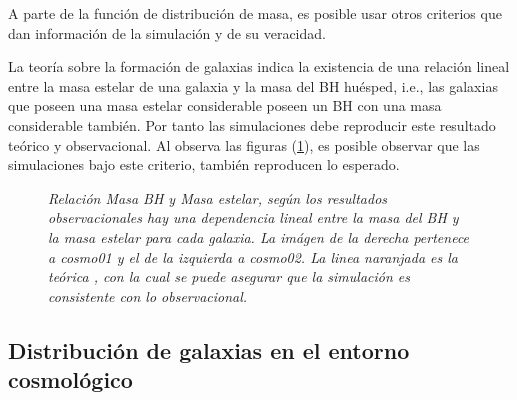 A parte de la función de distribución de masa, es posible usar otros criterios que dan información de la simulación y de su veracidad. 

La teoría sobre la formación de galaxias indica la existencia de una relación lineal entre la masa estelar de una galaxia y la masa del BH huésped, i.e., las galaxias que poseen una masa estelar considerable poseen un BH con una masa considerable también. Por tanto las simulaciones debe reproducir este resultado teórico y observacional. Al observa las figuras (\ref{fig: Mass_bhVsMass_stelar}), es posible observar que las simulaciones bajo este criterio, también reproducen lo esperado. 
%
 \begin{figure}
 \centering
 \caption{\emph{Relación Masa BH y Masa estelar, según los resultados observacionales hay una dependencia lineal entre la masa del BH y la masa estelar para cada galaxia. La imágen de la derecha pertenece a {\it{cosmo01}} y el de la izquierda a {\it{cosmo02}}. La linea naranjada es la teórica \cite{McConnell2013}, con la cual se puede asegurar que la simulación es consistente con lo observacional.}}
 \label{fig: Mass_bhVsMass_stelar}
\end{figure}
%
    \subsection{ Distribución de galaxias en el entorno cosmológico}
    \label{subsec: Distribucion de galaxias}

